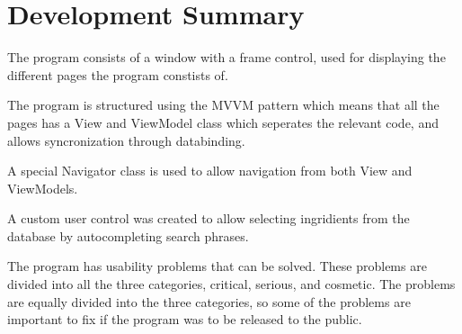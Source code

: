 \chapter{Development Summary}
The program consists of a window with a frame control, used for displaying the different pages the program constists of.

The program is structured using the MVVM pattern which means that all the pages has a View and ViewModel class which seperates the relevant code, and allows syncronization through databinding.

A special Navigator class is used to allow navigation from both View and ViewModels.

A custom user control was created to allow selecting ingridients from the database by autocompleting search phrases.

The program has usability problems that can be solved. These problems are divided into all the three categories, critical, serious, and cosmetic. The problems are equally divided into the three categories, so some of the problems are important to fix if the program was to be released to the public.